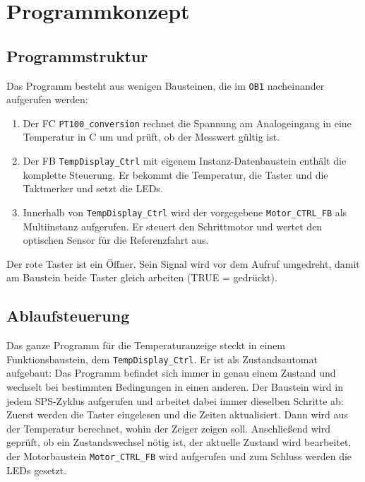 \section{Programmkonzept}
\label{sec:programmkonzept}

\subsection{Programmstruktur}
Das Programm besteht aus wenigen Bausteinen, die im \texttt{OB1} nacheinander aufgerufen werden:
\begin{enumerate}[itemsep=0pt, topsep=2pt]
    \item Der FC \texttt{PT100\_conversion} rechnet die Spannung am Analogeingang in eine Temperatur in \textdegree C um und prüft, ob der Messwert gültig ist.
    \item Der FB \texttt{TempDisplay\_Ctrl} mit eigenem Instanz-Datenbaustein enthält die komplette Steuerung. Er bekommt die Temperatur, die Taster und die Taktmerker und setzt die LEDs.
    \item Innerhalb von \texttt{TempDisplay\_Ctrl} wird der vorgegebene \texttt{Motor\_CTRL\_FB} als Multiinstanz aufgerufen. Er steuert den Schrittmotor und wertet den optischen Sensor für die Referenzfahrt aus.
\end{enumerate}
Der rote Taster ist ein Öffner. Sein Signal wird vor dem Aufruf umgedreht, damit am Baustein beide Taster gleich arbeiten (TRUE = gedrückt).

\subsection{Ablaufsteuerung}
Das ganze Programm für die Temperaturanzeige steckt in einem Funktionsbaustein, dem \texttt{TempDisplay\_Ctrl}. 
Er ist als Zustandsautomat aufgebaut: Das Programm befindet sich immer in genau einem Zustand und wechselt bei bestimmten Bedingungen in einen anderen. 
Der Baustein wird in jedem SPS-Zyklus aufgerufen und arbeitet dabei immer dieselben Schritte ab:
Zuerst werden die Taster eingelesen und die Zeiten aktualisiert. Dann wird aus der Temperatur berechnet, wohin der Zeiger zeigen soll. 
Anschließend wird geprüft, ob ein Zustandswechsel nötig ist, der aktuelle Zustand wird bearbeitet, der Motorbaustein \texttt{Motor\_CTRL\_FB} wird aufgerufen und zum Schluss werden die LEDs gesetzt.

